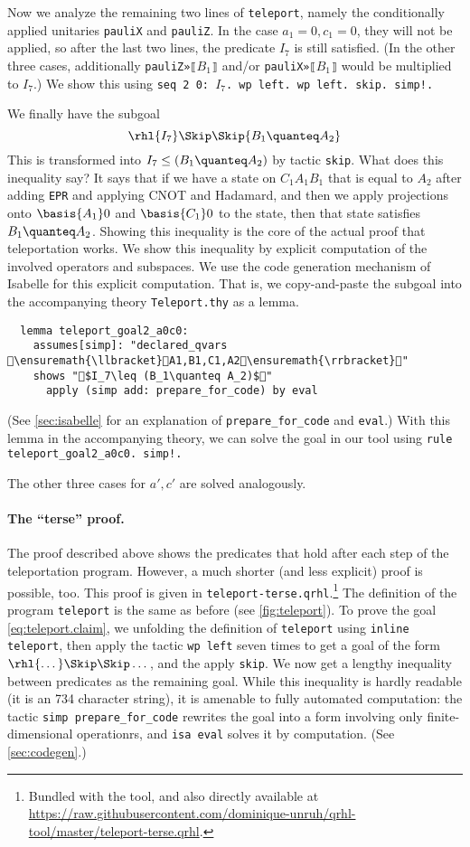 \documentclass{article}
\newcommand\giturl[1]{\url{https://raw.githubusercontent.com/dominique-unruh/qrhl-tool/master/#1}}
\begin{document}
Now we analyze the remaining two lines of \texttt{teleport}, namely
the conditionally applied unitaries \texttt{pauliX} and
\texttt{pauliZ}. In the case $a_1=0,c_1=0$,
they will not be applied, so after the last two lines, the predicate
$I_7$
is still satisfied. (In the other three cases, additionally
\texttt{pauliZ»⟦$B_1$⟧}
and/or \texttt{pauliX»⟦$B_1$⟧}
would be multiplied to $I_7$.)
We show this using \texttt{\frenchspacing seq 2 0: $I_7$.
  wp left. wp left. skip. simp!.}

We finally have the subgoal
\[
  \rhl{I_7}\Skip\Skip{B_1\quanteq A_2}
\]
This is transformed into $I_7\leq (B_1\quanteq A_2)$
by tactic \texttt{skip}.  What does this inequality say? It says that
if we have a state on $C_1A_1B_1$
that is equal to $A_2$
after adding \texttt{EPR} and applying CNOT and Hadamard, and then we
apply projections onto $\basis{A_1}0$
and $\basis{C_1}0$ to the state,
then that state satisfies $B_1\quanteq A_2$.
Showing this inequality is the core of the actual proof that teleportation
works. We show this inequality by explicit computation of the involved operators
and subspaces. We use the code generation mechanism of Isabelle for
this explicit computation.  That is, we copy-and-paste
the subgoal into the accompanying theory \texttt{Teleport.thy} as a lemma.
\begin{lstlisting}
  lemma teleport_goal2_a0c0:
    assumes[simp]: "declared_qvars \ensuremath{\llbracket}A1,B1,C1,A2\ensuremath{\rrbracket}"
    shows "$I_7\leq (B_1\quanteq A_2)$"
      apply (simp add: prepare_for_code) by eval
\end{lstlisting}
(See \autoref{sec:isabelle} for an explanation of
\texttt{prepare\_for\_code} and \texttt{eval}.)  With this lemma in
the accompanying theory, we can solve the goal in our tool using
\texttt{\frenchspacing rule teleport\_goal2\_a0c0.  simp!.}

The other three cases for $a',c'$ are solved analogously.



\paragraph{The ``terse'' proof.}
The proof described above shows the predicates that hold after each
step of the teleportation program. However, a much shorter (and less
explicit) proof is possible, too. This proof is given in
\texttt{teleport-terse.qrhl}.\footnote{Bundled with the tool, and also
  directly available at \giturl{teleport-terse.qrhl}.}  The definition of the
program \texttt{teleport} is the same as before (see
\autoref{fig:teleport}). To prove the goal \eqref{eq:teleport.claim},
we unfolding the definition of \texttt{teleport} using \texttt{inline
  teleport}, then apply the tactic \texttt{wp left} seven times to get
a goal of the form $\rhl{\dots}\Skip\Skip\dots$,
and the apply \texttt{skip}. We now get a lengthy inequality between
predicates as the remaining goal. While this inequality is hardly
readable (it is an 734 character string), it is amenable to fully automated computation:
the tactic \texttt{simp prepare\_for\_code} rewrites the goal into a form involving only finite-dimensional operationrs, and \texttt{isa eval} solves it by computation.
(See \autoref{sec:codegen}.)
\end{document}
